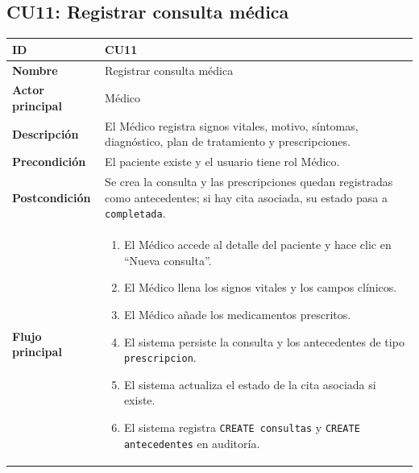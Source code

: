 \documentclass[11pt,a4paper]{article}
\begin{document}
\subsection*{CU11: Registrar consulta médica}
\begin{longtable}{|L{3.5cm}|L{10cm}|}
    \hline
    \textbf{ID}              & CU11                                                                                                                                       \\ \hline
    \textbf{Nombre}          & Registrar consulta médica                                                                                                                  \\ \hline
    \textbf{Actor principal} & Médico                                                                                                                                     \\ \hline
    \textbf{Descripción}     & El Médico registra signos vitales, motivo, síntomas, diagnóstico, plan de tratamiento y prescripciones.                                    \\ \hline
    \textbf{Precondición}    & El paciente existe y el usuario tiene rol Médico.                                                                                          \\ \hline
    \textbf{Postcondición}   & Se crea la consulta y las prescripciones quedan registradas como antecedentes; si hay cita asociada, su estado pasa a \texttt{completada}. \\ \hline
    \textbf{Flujo principal} &
    \begin{enumerate}
        \item El Médico accede al detalle del paciente y hace clic en ``Nueva consulta''.
        \item El Médico llena los signos vitales y los campos clínicos.
        \item El Médico añade los medicamentos prescritos.
        \item El sistema persiste la consulta y los antecedentes de tipo \texttt{prescripcion}.
        \item El sistema actualiza el estado de la cita asociada si existe.
        \item El sistema registra \texttt{CREATE consultas} y \texttt{CREATE antecedentes} en auditoría.
    \end{enumerate}                                                                   \\ \hline
\end{longtable}
\end{document}
